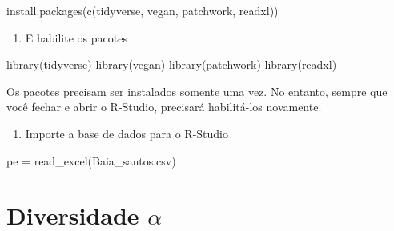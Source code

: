 \documentclass[
]{book}
\newenvironment{Shaded}{\begin{snugshade}}{\end{snugshade}}
\newcommand{\FunctionTok}[1]{\textcolor[rgb]{0.00,0.00,0.00}{#1}}
\newcommand{\NormalTok}[1]{#1}
\newcommand{\OtherTok}[1]{\textcolor[rgb]{0.56,0.35,0.01}{#1}}
\newcommand{\StringTok}[1]{\textcolor[rgb]{0.31,0.60,0.02}{#1}}
\providecommand{\tightlist}{%
  \setlength{\itemsep}{0pt}\setlength{\parskip}{0pt}}
\begin{document}
\begin{Shaded}
\begin{Highlighting}[]
\FunctionTok{install.packages}\NormalTok{(}\FunctionTok{c}\NormalTok{(}\StringTok{\textquotesingle{}tidyverse\textquotesingle{}}\NormalTok{, }\StringTok{\textquotesingle{}vegan\textquotesingle{}}\NormalTok{, }\StringTok{\textquotesingle{}patchwork\textquotesingle{}}\NormalTok{, }\StringTok{\textquotesingle{}readxl\textquotesingle{}}\NormalTok{))}
\end{Highlighting}
\end{Shaded}

\begin{enumerate}
\def\labelenumi{\arabic{enumi}.}
\setcounter{enumi}{3}
\tightlist
\item
  E habilite os pacotes
\end{enumerate}

\begin{Shaded}
\begin{Highlighting}[]
\FunctionTok{library}\NormalTok{(tidyverse)}
\FunctionTok{library}\NormalTok{(vegan)}
\FunctionTok{library}\NormalTok{(patchwork)}
\FunctionTok{library}\NormalTok{(readxl)}
\end{Highlighting}
\end{Shaded}

Os pacotes precisam ser instalados somente uma vez. No entanto, sempre que você fechar e abrir o R-Studio, precisará habilitá-los novamente.

\begin{enumerate}
\def\labelenumi{\arabic{enumi}.}
\setcounter{enumi}{4}
\tightlist
\item
  Importe a base de dados para o R-Studio
\end{enumerate}

\begin{Shaded}
\begin{Highlighting}[]
\NormalTok{pe }\OtherTok{=} \FunctionTok{read\_excel}\NormalTok{(}\StringTok{\textquotesingle{}Baia\_santos.csv\textquotesingle{}}\NormalTok{)}
\end{Highlighting}
\end{Shaded}

\hypertarget{diversidade-alpha}{%
\section{\texorpdfstring{Diversidade \(\alpha\)}{Diversidade \textbackslash alpha}}\label{diversidade-alpha}}
\end{document}
